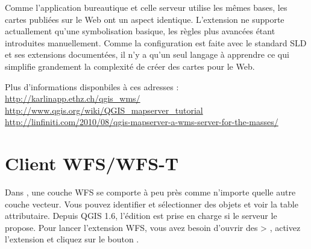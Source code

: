 Comme l'application bureautique et celle serveur utilise les mêmes bases, les cartes publiées sur le Web ont un aspect identique. L'extension ne supporte actuallement qu'une symbolisation basique, les règles plus avancées étant introduites manuellement. Comme la configuration est faite avec le standard SLD et ses extensions documentées, il n'y a qu'un seul langage à apprendre ce qui simplifie grandement la complexité de créer des cartes pour le Web.

Plus d'informations disponbiles à ces adresses :
\url{http://karlinapp.ethz.ch/qgis\_wms/} \\
\url{http://www.qgis.org/wiki/QGIS\_mapserver\_tutorial} \\
\url{http://linfiniti.com/2010/08/qgis-mapserver-a-wms-server-for-the-masses/}

\section{Client WFS/WFS-T}\label{sec:ogc-wfs}


Dans \qg, une couche WFS se comporte à peu près comme n'importe quelle autre couche vecteur. Vous pouvez identifier et sélectionner des objets et voir la table attributaire. Depuis QGIS 1.6, l'édition est prise en charge si le serveur le propose. Pour lancer l'extension WFS, vous avez besoin d'ouvrir des  > , activez l'extension  et cliquez sur le bouton .

